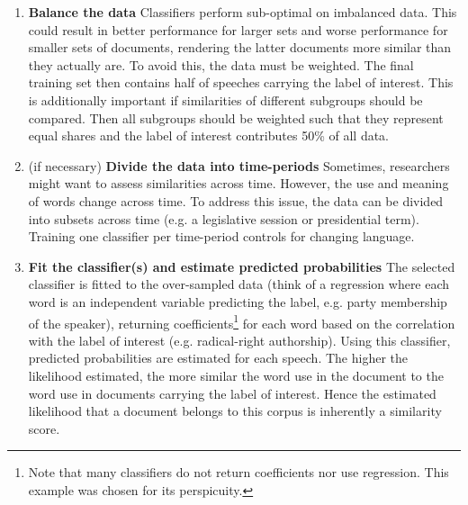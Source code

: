 \documentclass{article}
\begin{document}
\begin{enumerate}
    \item \textbf{Balance the data} \newline Classifiers perform sub-optimal on imbalanced data. This could result in better performance for larger sets and worse performance for smaller sets of documents, rendering the latter documents more similar than they actually are. To avoid this, the data must be weighted. The final training set then contains half of speeches carrying the label of interest. This is additionally important if similarities of different subgroups should be compared. Then all subgroups should be weighted such that they represent equal shares and the label of interest contributes 50\% of all data.  \par
    \item (if necessary) \textbf{Divide the data into time-periods} \newline Sometimes, researchers might want to assess similarities across time. However, the use and meaning of words change across time. To address this issue, the data can be divided into subsets across time (e.g. a legislative session or presidential term). Training one classifier per time-period controls for changing language.\par
    \item \textbf{Fit the classifier(s) and estimate predicted probabilities} \newline The selected classifier is fitted to the over-sampled data (think of a regression where each word is an independent variable predicting the label, e.g. party membership of the speaker), returning coefficients\footnote{Note that many classifiers do not return coefficients nor use regression. This example was chosen for its perspicuity.} for each word based on the correlation with the label of interest (e.g. radical-right authorship). Using this classifier, predicted probabilities are estimated for each speech. The higher the likelihood estimated, the more similar the word use in the document to the word use in documents carrying the label of interest. Hence the estimated likelihood that a document belongs to this corpus is inherently a similarity score.\par 
\end{enumerate}
\end{document}
